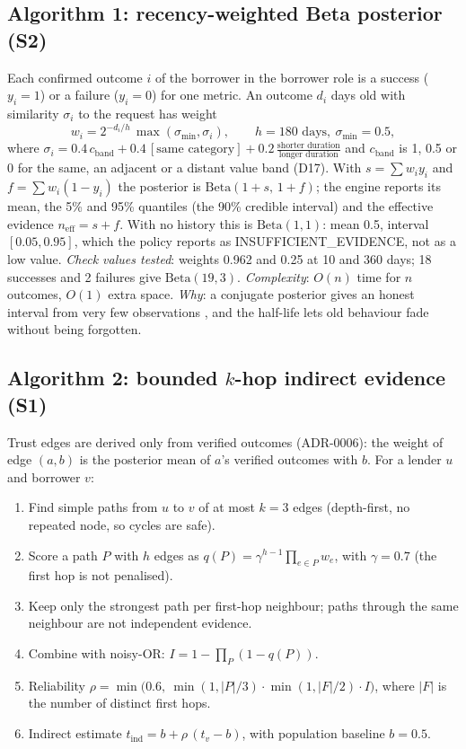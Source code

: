 \subsection{Algorithm 1: recency-weighted Beta posterior (S2)}\label{sec:algorithm-1-recency-weighted-beta}
Each confirmed outcome $i$ of the borrower in the borrower role is a success ($y_i = 1$) or a failure ($y_i = 0$) for one metric. An outcome $d_i$ days old with similarity $\sigma_i$ to the request has weight
\[
w_i = 2^{-d_i/h}\,\max(\sigma_{\min}, \sigma_i), \qquad h = 180 \text{ days},\ \sigma_{\min} = 0.5,
\]
where $\sigma_i = 0.4\,c_{\mathrm{band}} + 0.4\,[\text{same category}] + 0.2\,\frac{\text{shorter duration}}{\text{longer duration}}$ and $c_{\mathrm{band}}$ is 1, 0.5 or 0 for the same, an adjacent or a distant value band (D17). With $s = \sum w_i y_i$ and $f = \sum w_i (1 - y_i)$ the posterior is $\mathrm{Beta}(1+s,\,1+f)$; the engine reports its mean, the 5\% and 95\% quantiles (the 90\% credible interval) and the effective evidence $n_{\mathrm{eff}} = s + f$. With no history this is $\mathrm{Beta}(1,1)$: mean 0.5, interval $[0.05, 0.95]$, which the policy reports as INSUFFICIENT\_EVIDENCE, not as a low value. \textit{Check values tested}: weights 0.962 and 0.25 at 10 and 360 days; 18 successes and 2 failures give $\mathrm{Beta}(19,3)$. \textit{Complexity}: $O(n)$ time for $n$ outcomes, $O(1)$ extra space. \textit{Why}: a conjugate posterior gives an honest interval from very few observations \cite{josang2002beta}, and the half-life lets old behaviour fade without being forgotten.

\subsection{Algorithm 2: bounded $k$-hop indirect evidence (S1)}\label{sec:algorithm-2-bounded-hop-indirect}
Trust edges are derived only from verified outcomes (ADR-0006): the weight of edge $(a,b)$ is the posterior mean of $a$'s verified outcomes with $b$. For a lender $u$ and borrower $v$:

\begin{enumerate}
\item Find simple paths from $u$ to $v$ of at most $k = 3$ edges (depth-first, no repeated node, so cycles are safe).
\item Score a path $P$ with $h$ edges as $q(P) = \gamma^{h-1} \prod_{e \in P} w_e$, with $\gamma = 0.7$ (the first hop is not penalised).
\item Keep only the strongest path per first-hop neighbour; paths through the same neighbour are not independent evidence.
\item Combine with noisy-OR: $I = 1 - \prod_{P} (1 - q(P))$.
\item Reliability $\rho = \min\bigl(0.6,\ \min(1, |P|/3) \cdot \min(1, |F|/2) \cdot I\bigr)$, where $|F|$ is the number of distinct first hops.
\item Indirect estimate $t_{\mathrm{ind}} = b + \rho\,(t_v - b)$, with population baseline $b = 0.5$.
\end{enumerate}

